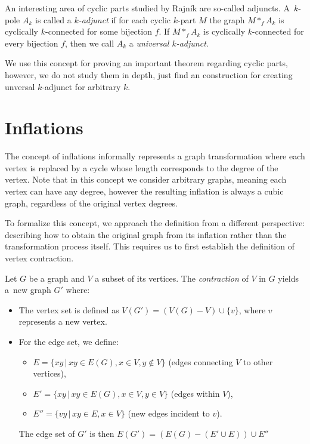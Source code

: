 \documentclass[12pt, twoside]{book}
\begin{document}
An interesting area of cyclic parts studied by Rajník \cite{Rajnik_phd} are so-called adjuncts. A~$k$-pole $A_k$ is called a \textit{$k$-adjunct} if for each cyclic $k$-part $M$ the graph $M*_f A_k$ is cyclically $k$-connected for some bijection $f$. If $M*_f A_k$ is cyclically $k$-connected for every bijection $f$, then we call $A_k$ a \emph{universal $k$-adjunct}.

We use this concept for proving an important theorem regarding cyclic parts, however, we do not study them in depth, just find an construction for creating unversal $k$-adjunct for arbitrary $k$. 

\section{Inflations}\label{sec:inflations}

The concept of inflations informally represents a graph transformation where each vertex is replaced by a cycle whose length corresponds to the degree of the vertex. Note that in this concept we consider arbitrary graphs, meaning each vertex can have any degree, however the resulting inflation is always a cubic graph, regardless of the original vertex degrees.

To formalize this concept, we approach the definition from a different perspective: describing how to obtain the original graph from its inflation rather than the transformation process itself. This requires us to first establish the definition of vertex contraction.

Let $G$ be a graph and $V$ a subset of its vertices. The \textit{contraction} of $V$ in $G$ yields a~new graph $G'$ where:
\begin{itemize}
	\item The vertex set is defined as $V(G') = (V(G)-V)\cup \{v\}$, where $v$ represents a new vertex.
	\item For the edge set, we define:
	\begin{itemize}
		\item $E=\{xy\,|\,xy\in E(G), x\in V, y\notin V\}$ (edges connecting $V$ to other vertices),
		\item $E'=\{xy\,|\,xy\in E(G), x\in V, y\in V\}$ (edges within $V$),
		\item $E''=\{vy\,|\, xy\in E, x\in V\}$ (new edges incident to $v$).
	\end{itemize}
	
	The edge set of $G'$ is then ${E(G')=\left(E(G)-\left(E'\cup E\right)\right)\cup E''}$
\end{itemize}
\end{document}
